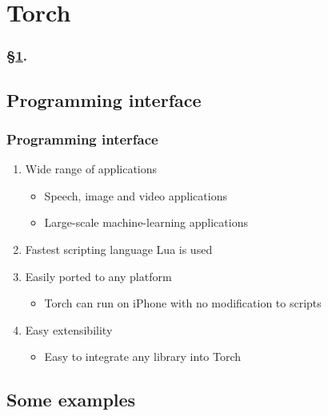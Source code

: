 
\section{Torch}\label{sec:Torch}


\frameinlbffalse

\begin{frame}[plain]
\frametitle{\S\ref{sec:Torch}. \insertsection}
\listofframes
\end{frame}
\addtocounter{framenumber}{-1} %

\frameinlbftrue

\subsection{Programming interface}

\begin{frame}
  \MyLogo
  \frametitle{Programming interface}  
\begin{enumerate}
\item Wide range of applications
\begin{itemize}
\item Speech, image and video applications
\item  Large-scale machine-learning applications
\end{itemize}
\item Fastest scripting language Lua is used
\item Easily ported to any platform
\begin{itemize}
\item Torch can run on iPhone with no modification to scripts
\end{itemize}
\item Easy extensibility
\begin{itemize}
\item Easy to integrate any library into Torch
\end{itemize}
\end{enumerate}
\end{frame}

\subsection{Some examples}

